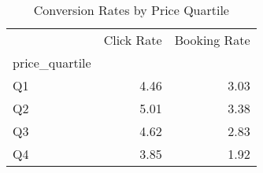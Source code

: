 \begin{table}
\caption{Conversion Rates by Price Quartile}
\label{tab:price_impact}
\begin{tabular}{lrr}
\toprule
 & Click Rate & Booking Rate \\
price_quartile &  &  \\
\midrule
Q1 & 4.46 & 3.03 \\
Q2 & 5.01 & 3.38 \\
Q3 & 4.62 & 2.83 \\
Q4 & 3.85 & 1.92 \\
\bottomrule
\end{tabular}
\end{table}
